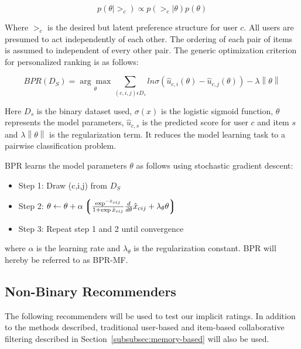 \begin{equation}
p(\theta | >_c) \propto p(>_c | \theta) p(\theta)
\end{equation}

Where $>_c$ is the desired but latent preference structure for user $c$. All users are presumed to act
independently of each other. The ordering of each pair of items is assumed to independent of every other pair.
The generic optimization criterion for personalized ranking is as follows:

\begin{equation}
BPR(D_S) = \underset{\theta}{\arg\max} \sum_{(c,i,j)\epsilon D_s} ln \sigma(\hat{u}_{c,i}(\theta)-\hat{u}_{c,j}(\theta)) - \lambda \left\|\theta \right\|
\end{equation}

Here $D_s$ is the binary dataset used, $\sigma(x)$ is the logistic sigmoid function, $\theta$ represents
the model parameters, $\hat{u}_{c,s}$ is the predicted score for user $c$ and item $s$ and
$\lambda \left\|\theta \right\|$ is the regularization term. It reduces the model learning task to
a pairwise classification problem.\newline

BPR learns the model parameters $\theta$ as follows using stochastic gradient descent:

\begin{itemize}
\item Step 1: Draw (c,i,j) from $D_S$
\item Step 2: $\theta \leftarrow \theta + \alpha \left\lgroup \frac{\exp^{-\hat{x}_{cij}}}{1+\exp{\hat{x}_{cij}}}  \frac{d}{d \theta} \hat{x}_{cij} + \lambda_{\theta} \theta \right\rgroup$
\item Step 3: Repeat step 1 and 2 until convergence
\end{itemize}

where $\alpha$ is the learning rate and $\lambda_{\theta}$ is the regularization constant. BPR will hereby be
referred to as BPR-MF.

\subsection{Non-Binary Recommenders}

The following recommenders will be used to test our implicit ratings. In addition to the methods described,
traditional user-based and item-based collaborative filtering described in Section~\ref{subsubsec:memory-based} will
also be used.

